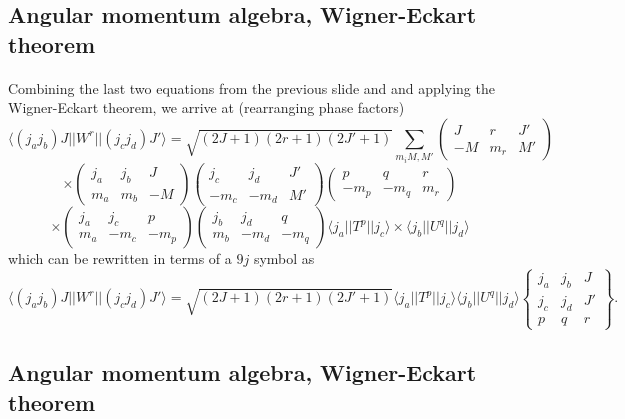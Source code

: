 \documentclass[%
twoside,                 %
final,                   %
10pt]{article}
\begin{document}
\subsection*{Angular momentum algebra, Wigner-Eckart theorem}

\paragraph{}
Combining the last two equations from the previous slide and 
and applying the Wigner-Eckart theorem, we arrive at (rearranging phase factors)
\[
\langle (j_aj_b)J||W^{r}||(j_cj_d)J'\rangle=\sqrt{(2J+1)(2r+1)(2J'+1)}\sum_{m_iM,M'}\left(\begin{array}{ccc}  J & r & J' \\ -M & m_r & M'\end{array}\right)
\]
\[
\times\left(\begin{array}{ccc} j_a  &j_b  & J \\ m_a &m_b &-M \end{array}\right)
\left(\begin{array}{ccc} j_c  &j_d  &J'  \\ -m_c &-m_d &M' \end{array}\right)
\left(\begin{array}{ccc} p  & q & r \\  -m_p&-m_q &m_r \end{array}\right)
\]
\[
\times\left(\begin{array}{ccc} j_a  &j_c  &p  \\ m_a &-m_c &-m_p \end{array}\right)\left(\begin{array}{ccc} j_b  &j_d  &q  \\ m_b &-m_d &-m_q \end{array}\right)\langle j_a||T^p||j_c\rangle \times \langle j_b||U^q||j_d\rangle
\]
which can be rewritten in terms of a $9j$ symbol as 
\[
\langle (j_aj_b)J||W^{r}||(j_cj_d)J'\rangle=\sqrt{(2J+1)(2r+1)(2J'+1)}\langle j_a||T^p||j_c\rangle  \langle j_b||U^q||j_d\rangle\left\{\begin{array}{ccc} j_a & j_b& J \\ j_c & j_d & J' \\ p & q& r\end{array}\right\}.
\]



\subsection*{Angular momentum algebra, Wigner-Eckart theorem}
\end{document}
